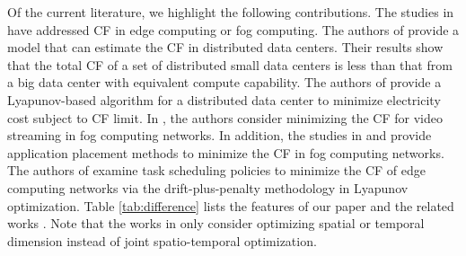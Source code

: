\documentclass[conference, 10pt, ﬁnal, letterpaper, twocolumn]{IEEEtran}
\begin{document}
Of the current literature, we highlight the following contributions. The studies in \cite{van2012distributed, Rad2022Carbon, do2015proximal, aldossary2021towards, ahvar2021deca, yang2022carbon} have addressed CF in edge computing or fog computing. The authors of \cite{van2012distributed} provide a model that can estimate the CF in distributed data centers. Their results show that the total CF of a set of distributed small data centers is less than that from a big data center with equivalent compute capability. The authors of \cite{Rad2022Carbon} provide a Lyapunov-based algorithm for a distributed data center to minimize electricity cost subject to CF limit. In \cite{do2015proximal}, the authors consider minimizing the CF for video streaming in fog computing networks. In addition, the studies in \cite{aldossary2021towards} and \cite{ahvar2021deca} provide application placement methods to minimize the CF in fog computing networks. The authors of \cite{yang2022carbon} examine task scheduling policies to minimize the CF of edge computing networks via the drift-plus-penalty methodology in Lyapunov optimization. Table \ref{tab:difference} lists the features of our paper and the related works \cite{van2012distributed, Rad2022Carbon, do2015proximal, aldossary2021towards, ahvar2021deca, yang2022carbon}. Note that the works in \cite{van2012distributed, Rad2022Carbon, do2015proximal, aldossary2021towards, ahvar2021deca} only consider optimizing spatial or temporal dimension instead of joint spatio-temporal optimization. 


\end{document}
